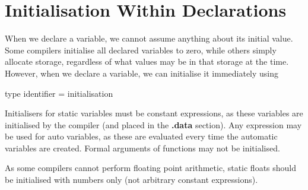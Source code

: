 \section{Initialisation Within Declarations}
     When we  declare a  variable, we cannot assume anything about its
initial value. Some  compilers initialise all declared variables to
zero, while others simply allocate  storage, regardless  of what
values may be in that storage at the  time.  However,  when  we 
declare  a  variable,  we  can  initialise  it immediately using
\begin{display}\ms
type identifier\/ {\cd =} initialisation
\end{display}
\noindent
     Initialisers for  {\cd static} variables must be constant
expressions, as these variables are  initialised by  the compiler
(and placed in the {\bf .data} section).  Any expression may be used
for {\cd auto} variables, as these are evaluated every time the
automatic  variables  are  created.  Formal  arguments  of functions
may not  be initialised.

     As some compilers cannot perform floating point arithmetic, {\cd
static float}s should be initialised with numbers only (not arbitrary
constant expressions).

